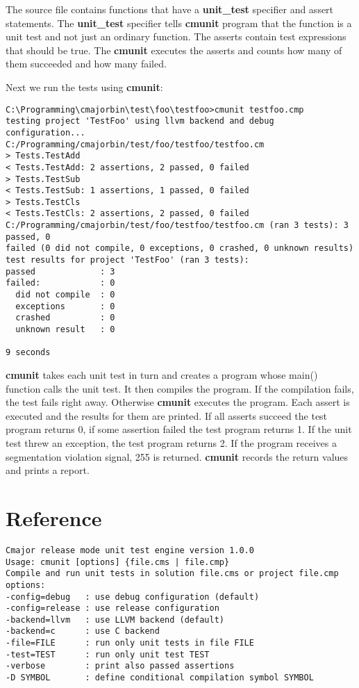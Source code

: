 \documentclass[oneside, a4paper, 11pt]{article}
\begin{document}
The source file contains functions
that have a \textbf{unit\_test} specifier
and assert statements.
The \textbf{unit\_test} specifier
tells \textbf{cmunit} program that
the function is a unit test and not
just an ordinary function.
The asserts contain test expressions
that should be true.
The \textbf{cmunit} executes
the asserts and counts how many of them
succeeded and how many failed.

Next we run the tests using \textbf{cmunit}:

\begin{verbatim}
C:\Programming\cmajorbin\test\foo\testfoo>cmunit testfoo.cmp
testing project 'TestFoo' using llvm backend and debug configuration...
C:/Programming/cmajorbin/test/foo/testfoo/testfoo.cm
> Tests.TestAdd
< Tests.TestAdd: 2 assertions, 2 passed, 0 failed
> Tests.TestSub
< Tests.TestSub: 1 assertions, 1 passed, 0 failed
> Tests.TestCls
< Tests.TestCls: 2 assertions, 2 passed, 0 failed
C:/Programming/cmajorbin/test/foo/testfoo/testfoo.cm (ran 3 tests): 3 passed, 0
failed (0 did not compile, 0 exceptions, 0 crashed, 0 unknown results)
test results for project 'TestFoo' (ran 3 tests):
passed             : 3
failed:            : 0
  did not compile  : 0
  exceptions       : 0
  crashed          : 0
  unknown result   : 0

9 seconds
\end{verbatim}

\textbf{cmunit} takes each unit test in turn and creates a
program whose main() function calls the unit test.
It then compiles the program. If the compilation fails, the
test fails right away. Otherwise \textbf{cmunit}
executes the program. Each assert is executed and the results
for them are printed. If all asserts succeed the test program returns 0,
if some assertion failed the test program returns 1.
If the unit test threw an exception, the test program returns 2.
If the program receives a segmentation violation signal, 255 is returned.
\textbf{cmunit} records the return values and prints a report.

\section{Reference}

\begin{verbatim}
Cmajor release mode unit test engine version 1.0.0
Usage: cmunit [options] {file.cms | file.cmp}
Compile and run unit tests in solution file.cms or project file.cmp
options:
-config=debug   : use debug configuration (default)
-config=release : use release configuration
-backend=llvm   : use LLVM backend (default)
-backend=c      : use C backend
-file=FILE      : run only unit tests in file FILE
-test=TEST      : run only unit test TEST
-verbose        : print also passed assertions
-D SYMBOL       : define conditional compilation symbol SYMBOL\end{verbatim}
\end{document}
